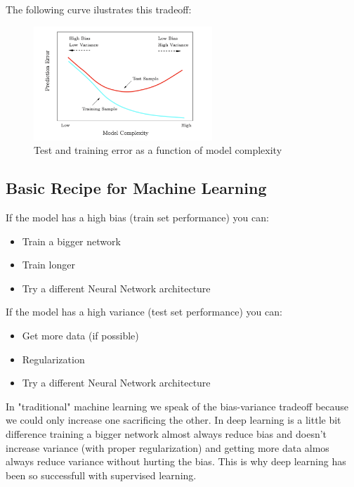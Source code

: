 The following curve ilustrates this tradeoff:

\begin{figure}[H]
    \begin{center}
            \includegraphics[width=0.6\textwidth]{img/bias-variance.png}
            \caption{Test and training error as a function of model complexity}
        \end{center}
\end{figure}

\subsection*{Basic Recipe for Machine Learning}

If the model has a high bias (train set performance) you can:
\begin{itemize}
    \item Train a bigger network
    \item Train longer
    \item Try a different Neural Network architecture
\end{itemize}

If the model has a high variance (test set performance) you can:
\begin{itemize}
    \item Get more data (if possible)
    \item Regularization
    \item Try a different Neural Network architecture
\end{itemize}

In "traditional" machine learning we speak of the bias-variance tradeoff because we 
could only increase one sacrificing the other. In deep learning is a little bit difference
training a bigger network almost always reduce bias and doesn't increase variance (with
proper regularization) and getting more data almos always reduce variance without 
hurting the bias. This is why deep learning has been so successfull with supervised
learning.

